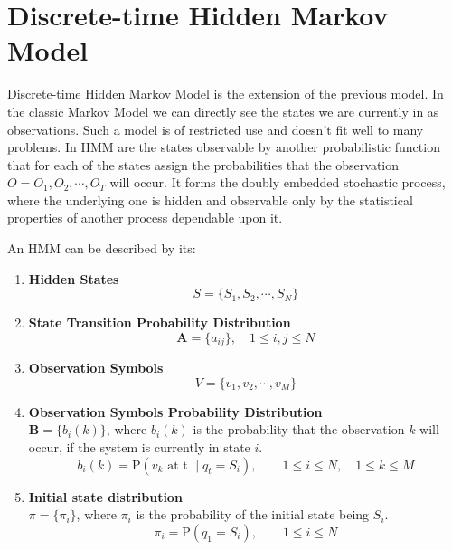\documentclass[thesis=M,english]{FITthesis}[2012/10/20]
\newcommand{\matr}[1]{\mathbf{#1}}
\begin{document}
\section{Discrete-time Hidden Markov Model}

Discrete-time Hidden Markov Model is the extension of the previous model. In the classic Markov Model we can directly see the states we are currently in as observations. Such a model is of restricted use and doesn't fit well to many problems. In HMM are the states observable by another probabilistic function that for each of the states assign the probabilities that the observation $O = O_1,O_2,\cdots,O_T$ will occur. It forms the doubly embedded stochastic process, where the underlying one is hidden and observable only by the statistical properties of another process dependable upon it.

An HMM can be described by its:

\begin{enumerate}[resume]
\setcounter{enumi}{0}
\item \textbf{Hidden States}
\begin{equation}
S = \{ S_1,S_2, \cdots, S_N \}
\end{equation} 
\item \textbf{State Transition Probability Distribution}
\begin{equation}\label{eq:tp}
\matr{A} = \{ a_{ij} \}, \quad 1 \leq i,j \leq N
\end{equation} 
\item \textbf{Observation Symbols}
\begin{equation}
V = \{ v_1,v_2, \cdots, v_M \} 
\end{equation}
\item \textbf{Observation Symbols Probability Distribution} \\
$\matr{B} = \{ b_{i}(k) \}$, where $b_{i}(k)$ is the probability that the observation $k$ will occur, if the system is currently in state $i$. 
\begin{equation}
b_i(k) = \mathrm{P}(v_k \text{ at t } \mid q_t = S_i), \qquad 1 \leq i \leq N, \quad 1 \leq k \leq M
\end{equation}
\item \textbf{Initial state distribution} \\
$\pi = \{ \pi_i \}$, where $\pi_i$ is the probability of the initial state being $S_i$.
\begin{equation}
\pi_{i} = \mathrm{P}(q_1 = S_i), \qquad 1 \leq i \leq N
\end{equation}
\end{enumerate}
\end{document}
